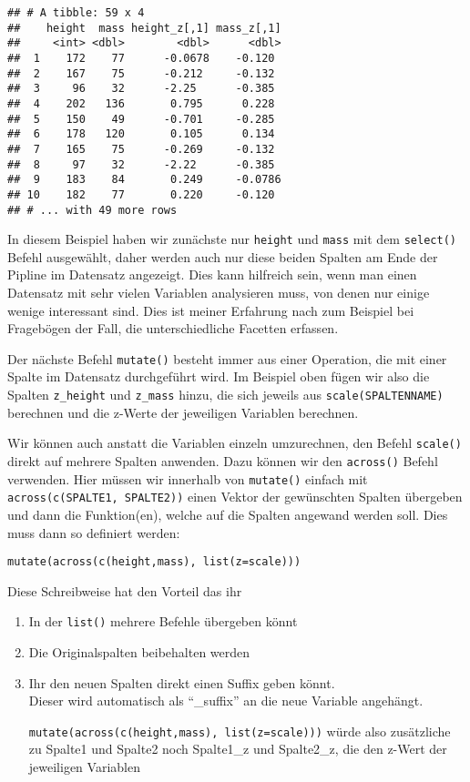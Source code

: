 \documentclass[
]{book}
\theoremstyle{definition}
\theoremstyle{definition}
\theoremstyle{definition}
\theoremstyle{definition}
\theoremstyle{remark}
\begin{document}
\begin{verbatim}
## # A tibble: 59 x 4
##    height  mass height_z[,1] mass_z[,1]
##     <int> <dbl>        <dbl>      <dbl>
##  1    172    77      -0.0678    -0.120 
##  2    167    75      -0.212     -0.132 
##  3     96    32      -2.25      -0.385 
##  4    202   136       0.795      0.228 
##  5    150    49      -0.701     -0.285 
##  6    178   120       0.105      0.134 
##  7    165    75      -0.269     -0.132 
##  8     97    32      -2.22      -0.385 
##  9    183    84       0.249     -0.0786
## 10    182    77       0.220     -0.120 
## # ... with 49 more rows
\end{verbatim}

In diesem Beispiel haben wir zunächste nur \texttt{height} und \texttt{mass} mit dem \texttt{select()} Befehl ausgewählt, daher werden auch nur diese beiden Spalten am Ende der Pipline im Datensatz angezeigt. Dies kann hilfreich sein, wenn man einen Datensatz mit sehr vielen Variablen analysieren muss, von denen nur einige wenige interessant sind. Dies ist meiner Erfahrung nach zum Beispiel bei Fragebögen der Fall, die unterschiedliche Facetten erfassen.

Der nächste Befehl \texttt{mutate()} besteht immer aus einer Operation, die mit einer Spalte im Datensatz durchgeführt wird. Im Beispiel oben fügen wir also die Spalten \texttt{z\_height} und \texttt{z\_mass} hinzu, die sich jeweils aus \texttt{scale(SPALTENNAME)} berechnen und die z-Werte der jeweiligen Variablen berechnen.

Wir können auch anstatt die Variablen einzeln umzurechnen, den Befehl \texttt{scale()} direkt auf mehrere Spalten anwenden. Dazu können wir den \texttt{across()} Befehl verwenden. Hier müssen wir innerhalb von \texttt{mutate()} einfach mit \texttt{across(c(SPALTE1,\ SPALTE2))} einen Vektor der gewünschten Spalten übergeben und dann die Funktion(en), welche auf die Spalten angewand werden soll. Dies muss dann so definiert werden:

\texttt{mutate(across(c(height,mass),\ list(z=scale)))}

Diese Schreibweise hat den Vorteil das ihr

\begin{enumerate}
\def\labelenumi{\arabic{enumi}.}
\item
  In der \texttt{list()} mehrere Befehle übergeben könnt
\item
  Die Originalspalten beibehalten werden
\item
  Ihr den neuen Spalten direkt einen Suffix geben könnt.\\
  Dieser wird automatisch als ``\_suffix'' an die neue Variable angehängt.

  \texttt{mutate(across(c(height,mass),\ list(z=scale)))} würde also zusätzliche zu Spalte1 und Spalte2 noch Spalte1\_z und Spalte2\_z, die den z-Wert der jeweiligen Variablen
\end{enumerate}
\end{document}
